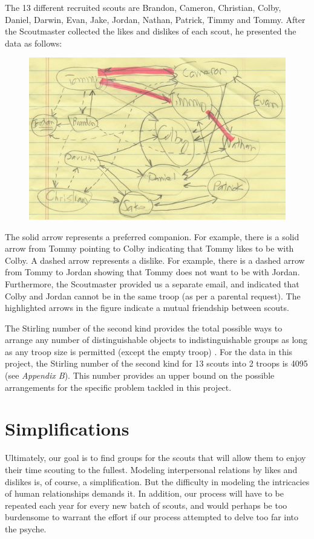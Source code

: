 \documentclass{amsart}
\theoremstyle{definition}
\theoremstyle{remark}
\numberwithin{equation}{section}
\begin{document}
The 13 different recruited scouts are Brandon, Cameron, Christian, Colby, Daniel, Darwin, Evan, Jake, Jordan, Nathan, Patrick, Timmy and Tommy. After the Scoutmaster collected the likes and dislikes of each scout, he presented the data as follows: 
\begin{figure}[h]
	\centering
	\includegraphics[scale=0.60]{graph}
\end{figure}

The solid arrow represents a preferred companion. For example, there is a solid arrow from Tommy pointing to Colby indicating that Tommy likes to be with Colby. A dashed arrow represents a dislike. For example, there is a dashed arrow from Tommy to Jordan showing that Tommy does not want to be with Jordan. Furthermore, the Scoutmaster provided us a separate email, and indicated that Colby and Jordan cannot be in the same troop (as per a parental request). The highlighted arrows in the figure indicate a mutual friendship between scouts.

The Stirling number of the second kind provides the total possible ways to arrange any number of distinguishable objects to indistinguishable groups as long as any troop size is permitted (except the empty troop) \cite{D}. For the data in this project, the Stirling number of the second kind for 13 scouts into 2 troops is 4095 (see \textit{Appendix B}). This number provides an upper bound on the possible arrangements for the specific problem tackled in this project.

\section*{Simplifications}
Ultimately, our goal is to find groups for the scouts that will allow them to enjoy their time scouting to the fullest. Modeling interpersonal relations by likes and dislikes is, of course, a simplification. But the difficulty in modeling the intricacies of human relationships demands it. In addition, our process will have to be repeated each year for every new batch of scouts, and would perhaps be too burdensome to warrant the effort if our process attempted to delve too far into the psyche.
\end{document}
